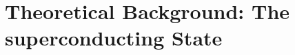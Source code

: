 \documentclass[11pt, letterpaper, titlepage]{article}
\begin{document}
\section{Theoretical Background: The superconducting State}
\end{document}
